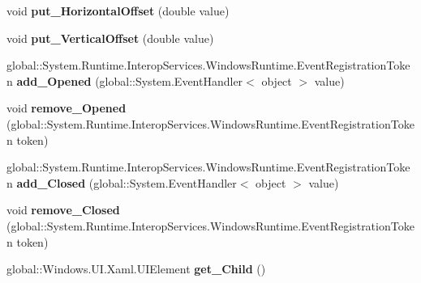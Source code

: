 \begin{DoxyCompactItemize}
void {\bfseries put\+\_\+\+Horizontal\+Offset} (double value)
\item 
\mbox{\label{interface_windows_1_1_u_i_1_1_xaml_1_1_controls_1_1_primitives_1_1_i_popup_a32f8e439f47db97069a953e214b6ca34}} 
void {\bfseries put\+\_\+\+Vertical\+Offset} (double value)
\item 
\mbox{\label{interface_windows_1_1_u_i_1_1_xaml_1_1_controls_1_1_primitives_1_1_i_popup_ab7ef34f049e0e256cb8967e69a9b98d7}} 
global\+::\+System.\+Runtime.\+Interop\+Services.\+Windows\+Runtime.\+Event\+Registration\+Token {\bfseries add\+\_\+\+Opened} (global\+::\+System.\+Event\+Handler$<$ object $>$ value)
\item 
\mbox{\label{interface_windows_1_1_u_i_1_1_xaml_1_1_controls_1_1_primitives_1_1_i_popup_a74799a81cbc767152e6840378638c41e}} 
void {\bfseries remove\+\_\+\+Opened} (global\+::\+System.\+Runtime.\+Interop\+Services.\+Windows\+Runtime.\+Event\+Registration\+Token token)
\item 
\mbox{\label{interface_windows_1_1_u_i_1_1_xaml_1_1_controls_1_1_primitives_1_1_i_popup_a9ad51ec03f9494cd9cd44d9aca1e407e}} 
global\+::\+System.\+Runtime.\+Interop\+Services.\+Windows\+Runtime.\+Event\+Registration\+Token {\bfseries add\+\_\+\+Closed} (global\+::\+System.\+Event\+Handler$<$ object $>$ value)
\item 
\mbox{\label{interface_windows_1_1_u_i_1_1_xaml_1_1_controls_1_1_primitives_1_1_i_popup_a737cc2cd2691f9cd97ecc0521717a7e8}} 
void {\bfseries remove\+\_\+\+Closed} (global\+::\+System.\+Runtime.\+Interop\+Services.\+Windows\+Runtime.\+Event\+Registration\+Token token)
\item 
\mbox{\label{interface_windows_1_1_u_i_1_1_xaml_1_1_controls_1_1_primitives_1_1_i_popup_a2a367d0d43b67f93a3e5d442297dcbd5}} 
global\+::\+Windows.\+U\+I.\+Xaml.\+U\+I\+Element {\bfseries get\+\_\+\+Child} ()

\end{DoxyCompactItemize}

